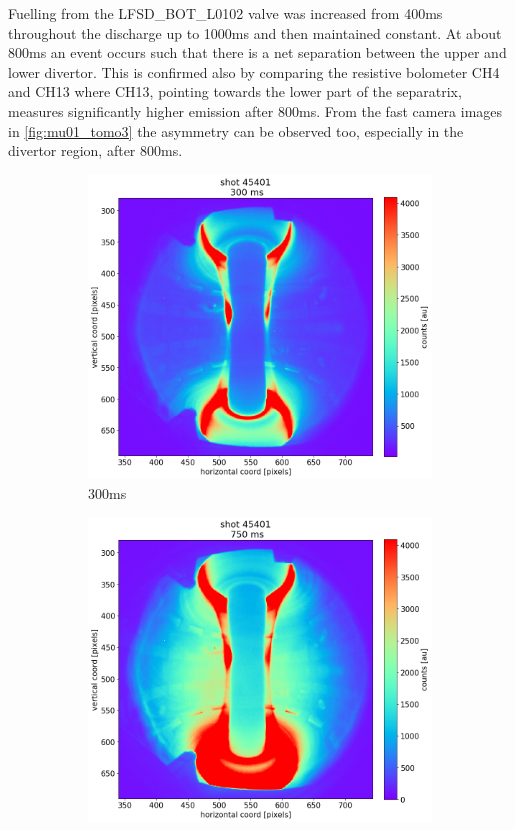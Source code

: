 Fuelling from the LFSD\_BOT\_L0102 valve was increased from 400ms throughout the discharge up to 1000ms and then maintained constant. At about 800ms an event occurs such that there is a net separation between the upper and lower divertor. This is confirmed also by comparing the resistive bolometer CH4 and CH13 where CH13, pointing towards the lower part of the separatrix, measures significantly higher emission after 800ms. From the fast camera images in \autoref{fig:mu01_tomo3} the asymmetry can be observed too, especially in the divertor region, after 800ms.
\begin{figure}[!ht]
    \centering
    \begin{subfigure}{0.3\linewidth}
         \centering
         \includegraphics[trim={60 0 120 60},clip,width=\textwidth]{Chapters/chapter2/figs/45401_for_paper_300ms.png}
         \caption{300ms}
         \label{fig:mu01_tomo3a}
    \end{subfigure}
    \begin{subfigure}{0.3\linewidth}
         \centering
         \includegraphics[trim={60 0 120 60},clip,width=\textwidth]{Chapters/chapter2/figs/45401_for_paper_750ms.png}

\end{subfigure}
\end{figure}
